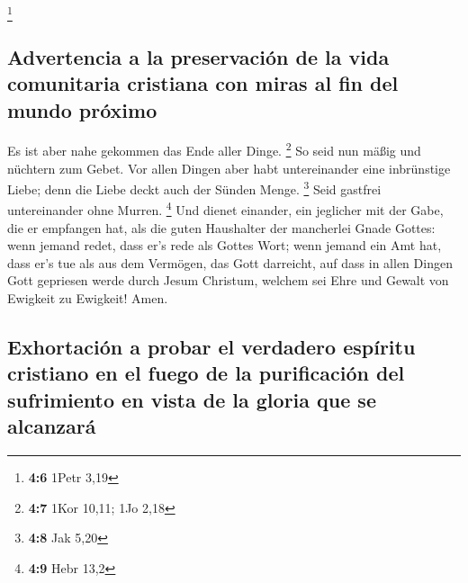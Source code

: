 \footnote{\textbf{4:6} 1Petr 3,19}

\hypertarget{advertencia-a-la-preservaciuxf3n-de-la-vida-comunitaria-cristiana-con-miras-al-fin-del-mundo-pruxf3ximo}{%
\subsection{Advertencia a la preservación de la vida comunitaria
cristiana con miras al fin del mundo
próximo}\label{advertencia-a-la-preservaciuxf3n-de-la-vida-comunitaria-cristiana-con-miras-al-fin-del-mundo-pruxf3ximo}}

 Es ist aber nahe gekommen das Ende aller Dinge.
\footnote{\textbf{4:7} 1Kor 10,11; 1Jo 2,18}  So seid nun
mäßig und nüchtern zum Gebet. Vor allen Dingen aber habt untereinander
eine inbrünstige Liebe; denn die Liebe deckt auch der Sünden Menge.
\footnote{\textbf{4:8} Jak 5,20}  Seid gastfrei
untereinander ohne Murren. \footnote{\textbf{4:9} Hebr 13,2}
 Und dienet einander, ein jeglicher mit der Gabe, die er
empfangen hat, als die guten Haushalter der mancherlei Gnade Gottes:
 wenn jemand redet, dass er's rede als Gottes Wort; wenn
jemand ein Amt hat, dass er's tue als aus dem Vermögen, das Gott
darreicht, auf dass in allen Dingen Gott gepriesen werde durch Jesum
Christum, welchem sei Ehre und Gewalt von Ewigkeit zu Ewigkeit! Amen.

\hypertarget{exhortaciuxf3n-a-probar-el-verdadero-espuxedritu-cristiano-en-el-fuego-de-la-purificaciuxf3n-del-sufrimiento-en-vista-de-la-gloria-que-se-alcanzaruxe1}{%
\subsection{Exhortación a probar el verdadero espíritu cristiano en el
fuego de la purificación del sufrimiento en vista de la gloria que se
alcanzará}\label{exhortaciuxf3n-a-probar-el-verdadero-espuxedritu-cristiano-en-el-fuego-de-la-purificaciuxf3n-del-sufrimiento-en-vista-de-la-gloria-que-se-alcanzaruxe1}}

